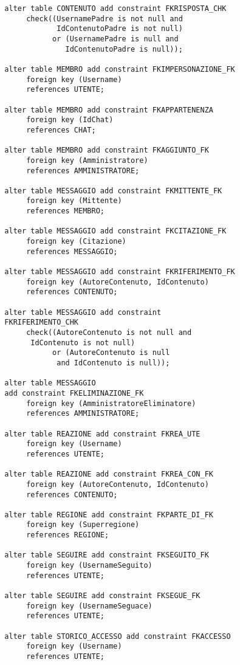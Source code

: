 \documentclass[a4paper,12pt]{report}
\begin{document}
\begin{lstlisting}
  alter table CONTENUTO add constraint FKRISPOSTA_CHK
       check((UsernamePadre is not null and 
              IdContenutoPadre is not null)
             or (UsernamePadre is null and
                IdContenutoPadre is null)); 
  
  alter table MEMBRO add constraint FKIMPERSONAZIONE_FK
       foreign key (Username)
       references UTENTE;
  
  alter table MEMBRO add constraint FKAPPARTENENZA
       foreign key (IdChat)
       references CHAT;
  
  alter table MEMBRO add constraint FKAGGIUNTO_FK
       foreign key (Amministratore)
       references AMMINISTRATORE;
  
  alter table MESSAGGIO add constraint FKMITTENTE_FK
       foreign key (Mittente)
       references MEMBRO;
  
  alter table MESSAGGIO add constraint FKCITAZIONE_FK
       foreign key (Citazione)
       references MESSAGGIO;
  
  alter table MESSAGGIO add constraint FKRIFERIMENTO_FK
       foreign key (AutoreContenuto, IdContenuto)
       references CONTENUTO;
  
  alter table MESSAGGIO add constraint 
  FKRIFERIMENTO_CHK
       check((AutoreContenuto is not null and
        IdContenuto is not null)
             or (AutoreContenuto is null
              and IdContenuto is null)); 
  
  alter table MESSAGGIO 
  add constraint FKELIMINAZIONE_FK
       foreign key (AmministratoreEliminatore)
       references AMMINISTRATORE;
  
  alter table REAZIONE add constraint FKREA_UTE
       foreign key (Username)
       references UTENTE;
  
  alter table REAZIONE add constraint FKREA_CON_FK
       foreign key (AutoreContenuto, IdContenuto)
       references CONTENUTO;
  
  alter table REGIONE add constraint FKPARTE_DI_FK
       foreign key (Superregione)
       references REGIONE;
  
  alter table SEGUIRE add constraint FKSEGUITO_FK
       foreign key (UsernameSeguito)
       references UTENTE;
  
  alter table SEGUIRE add constraint FKSEGUE_FK
       foreign key (UsernameSeguace)
       references UTENTE;
  
  alter table STORICO_ACCESSO add constraint FKACCESSO
       foreign key (Username)
       references UTENTE;
  

\end{lstlisting}
\end{document}
